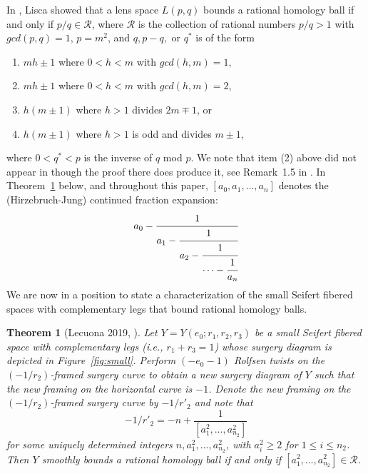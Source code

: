 \documentclass[11pt]{amsart}
\theoremstyle{plain}
\newtheorem{theorem}{Theorem}
\theoremstyle{definition}
\theoremstyle{remark}
\numberwithin{theorem}{section}
\begin{document}
In \cite{Lisca2007}, Lisca showed that a lens space $L(p,q)$ bounds a rational homology ball if and only if $p/q\in \mathcal{R}$, where $\mathcal{R}$ is the collection of rational numbers $p/q>1$ with $gcd(p,q)=1$, $p=m^2$, and $q, p-q,$ or $q^*$ is of the form\begin{enumerate}
\item $mh\pm 1$ where $0<h<m$ with $gcd(h,m)=1$,
\item  $mh\pm 1$ where $0<h<m$ with $gcd(h,m)=2$,
\item $h(m\pm1)$ where $h>1$ divides $2m\mp 1$, or
\item $h(m\pm 1)$ where $h>1$ is odd and divides $m\pm 1$, 
\end{enumerate}
where $0<q^*<p$ is the inverse of $q$ mod $p$. We note that item (2) above did not appear in \cite{Lisca2007} though the proof there does produce it, see Remark~1.5 in \cite{BakerBuckLecuona16}. In Theorem~\ref{lecuonas} below, and throughout this paper, $[a_0, a_1, \ldots, a_n]$ denotes the (Hirzebruch-Jung) continued fraction expansion: 
\[
  a_0-\cfrac{1}{a_1-\cfrac{1}{a_2-\cfrac{1}{\cdots- \cfrac{1}{a_n}}}}
\]
We are now in a position to state a characterization of the small Seifert fibered spaces with complementary legs that bound rational homology balls.

\begin{theorem}[Lecuona 2019, \cite{Lecuona2019}]\label{lecuonas}
Let $Y=Y(e_0;r_1,r_2,r_3)$ be a small Seifert fibered space with complementary legs (i.e.,  $r_1+r_3=1$) whose surgery diagram is depicted in Figure~\ref{fig:small}.  Perform $(-e_0-1)$  Rolfsen twists on the $(-1/r_2)$-framed surgery curve to obtain a new surgery diagram of $Y$ such that the new framing on the horizontal curve is $-1$. Denote the new framing on the $(-1/r_2)$-framed surgery curve  by $-1/r'_2$ and note that  $$-1/r'_2=-n + \frac{1}{[a^2_1, \ldots, a^2_{n_2}]}$$ for some uniquely determined integers $n, a_1^2, \ldots, a_{n_2}^2$, with $a_i^2 \geq 2$ for $1 \leq i \leq n_2$. Then $Y$ smoothly bounds a rational homology ball if and only if $[a_1^2,\ldots, a^2_{n_2}]\in \mathcal{R}$. 
\end{theorem}
\end{document}
